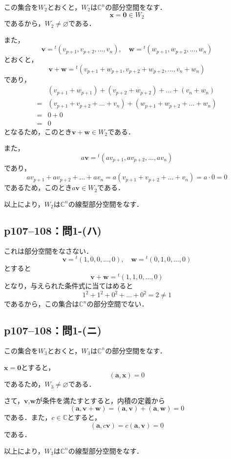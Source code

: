 \begin{tanswer}
  この集合を$W_2$とおくと，$W_2$は$\mathbb{C}^n$の部分空間をなす．
  \[
    \bm{x} = \bm{0} \in W_2
  \]
  であるから，$W_2 \ne \varnothing$である．

  また，
  \[
    \bm{v} ={}^t (v_{p+1} , v_{p+2} , \ldots , v_{n} ) , \quad \bm{w} ={}^t ( w_{p+1} , w_{p+2} , \ldots , w_{n} )
  \]
  とおくと，
  \[
    \bm{v}+ \bm{w} = {}^t (v_{p+1}+w_{p+1},v_{p+2}+w_{p+2},\ldots,v_n + w_n)
  \]
  であり，
  \begin{align*}
      & ( v_{p+1}+w_{p+1}) +(v_{p+2}+w_{p+2})+ \dots + (v_n+w_n) \\
    = & (v_{p+1}+v_{p+2}+\dots+v_n)+(w_{p+1}+w_{p+2}+\dots+w_n)  \\
    = & 0+0                                                      \\
    = & 0
  \end{align*}
  となるため，このとき$\bm{v}+\bm{w} \in W_2$である．

  また，
  \[
    a\bm{v} = {}^t (av_{p+1},av_{p+2},\ldots,av_n)
  \]
  であり，
  \[
    av_{p+1} + av_{p+2}+\dots + av_n =a (v_{p+1}+v_{p+2}+\dots+v_n) = a\cdot 0 =0
  \]
  であるため，このとき$a \bm{v} \in W_2$である．

  以上により，$W_2$は$\mathbb{C}^n$の線型部分空間をなす．
\end{tanswer}

\subsection*{p107--108：問1-(ハ)}

\begin{tanswer}
  これは部分空間をなさない．
  \[
    \bm{v}= {}^t (1,0,0,\ldots , 0),\quad \bm{w}={}^t (0,1,0,\ldots ,0)
  \]
  とすると
  \[
    \bm{v} + \bm{w}={}^t (1,1,0,\ldots,0)
  \]
  となり，与えられた条件式に当てはめると
  \[
    1^2+1^2+0^2 +\dots + 0^2 =2 \ne 1
  \]
  であるから，この集合は$\mathbb{C}^n$の部分空間でない．
\end{tanswer}


\subsection*{p107--108：問1-(ニ)}

\begin{tanswer}
  この集合を$W_3$とおくと，$W_3$は$\mathbb{C}^n$の部分空間をなす．

  $\bm{x}=\bm{0}$とすると，
  \[
    (\bm{a},\bm{x}) =0
  \]
  であるため，$W_3 \ne \varnothing$である．

  さて，$\bm{v}$,$\bm{w}$が条件を満たすとすると，内積の定義から
  \[
    (\bm{a},\bm{v}+\bm{w})=(\bm{a},\bm{v})+(\bm{a},\bm{w})=0
  \]
  である．また，$ c \in \mathbb{C}$とすると，
  \[
    (\bm{a},c\bm{v})=c(\bm{a},\bm{v})=0
  \]
  である．

  以上により，$W_3$は$\mathbb{C}^n$の線型部分空間をなす．
\end{tanswer}



